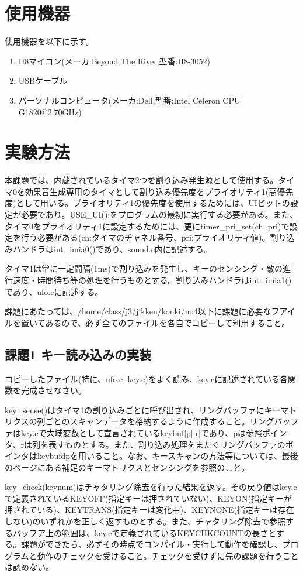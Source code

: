 ﻿\documentclass{jarticle}
\begin{document}
\section{使用機器}
使用機器を以下に示す。
\begin{enumerate}
	\item H8マイコン(メーカ:Beyond The River,型番:H8-3052)
	\item USBケーブル
	\item パーソナルコンピュータ(メーカ:Dell,型番:Intel Celeron CPU G1820@2.70GHz)
\end{enumerate}

\section{実験方法}
本課題では、内蔵されているタイマ2つを割り込み発生源として使用する。タイマ0を効果音生成専用のタイマとして割り込み優先度をプライオリティ1(高優先度)として用いる。プライオリティ1の優先度を使用するためには、UIビットの設定が必要であり。USE\_UI();をプログラムの最初に実行する必要がある。また、タイマ0をプライオリティ1に設定するためには、更にtimer\_pri\_set(ch, pri)で設定を行う必要がある(ch:タイマのチャネル番号、pri:プライオリティ値)。割り込みハンドラはint\_imia0()であり、sound.c内に記述する。


タイマ1は常に一定間隔(1ms)で割り込みを発生し、キーのセンシング・敵の進行速度・時間待ち等の処理を行うものとする。割り込みハンドラはint\_imia1()であり、ufo.cに記述する。


課題にあたっては、/home/class/j3/jikken/kouki/no4以下に課題に必要なフアイルを置いてあるので、必ず全てのファイルを各自でコピーして利用すること。


\subsection{課題1 キー読み込みの実装}
コピーしたファイル(特に、ufo.c, key.c)をよく読み、key.cに記述されている各関数を完成させなさい。


key\_sense()はタイマ1の割り込みごとに呼び出され、リングバッファにキーマトリクスの列ごとのスキャンデータを格納するように作成すること。リングバッファはkey.cで大域変数として宣言されているkeybuf[p][r]であり、pは参照ポインタ、rは列を表すものとする。また、割り込み処理をまたぐリングバッファのポインタはkeybufdpを用いること。なお、キースキャンの方法等については、最後のページにある補足のキーマトリクスとセンシングを参照のこと。


key\_check(keynum)はチャタリング除去を行った結果を返す。その戻り値はkey.cで定義されているKEYOFF(指定キーは押されていない)、KEYON(指定キーが押されている)、KEYTRANS(指定キーは変化中)、KEYNONE(指定キーは存在しない)のいずれかを正しく返すものとする。また、チャタリング除去で参照するバッフア上の範囲は、key.cで定義されているKEYCHKCOUNTの長さとする。課題ができたら、必ずその時点でコンパイル・実行して動作を確認し、プログラムと動作のチェックを受けること。チェックを受けずに先の課題を行うことは認めない。
\end{document}
